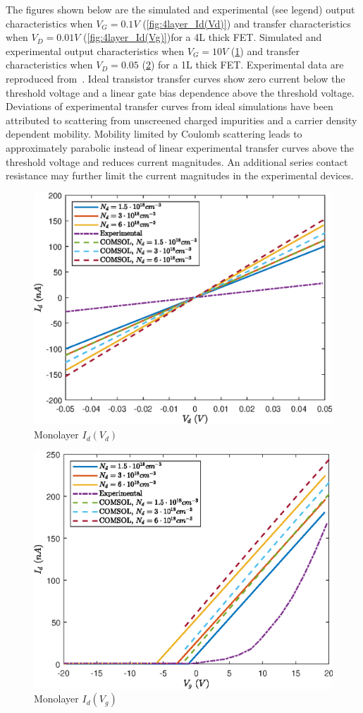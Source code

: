 \documentclass[12pt,a4paper,titlepage]{article}
\begin{document}
The figures shown below are the simulated and experimental (see legend) output characteristics when $V_G = 0.1 V$ (\ref{fig:4layer_Id(Vd)}) and transfer characteristics when $V_D = 0.01 V$ (\ref{fig:4layer_Id(Vg)})for a 4L thick FET. Simulated and experimental output characteristics when $V_G = 10 V$ (\ref{fig:monolayer_Id(Vd)}) and transfer characteristics when $V_D = 0.05$ (\ref{fig:monolayer_Id(Vg)}) for a 1L thick FET. Experimental data are reproduced from~\cite{Wu:Ultrathin_MoS2}. Ideal transistor transfer curves show zero current below the threshold voltage and a linear gate bias dependence above the threshold voltage. Deviations of experimental transfer curves from ideal simulations have been attributed to scattering from unscreened charged impurities and a carrier density dependent mobility. Mobility limited by Coulomb scattering leads to approximately parabolic instead of linear experimental transfer curves above the threshold voltage and reduces current magnitudes. An additional series contact resistance may further limit the current magnitudes in the experimental devices.

\begin{figure}[H]
	\centering
	\includegraphics[width=.8\textwidth]{Grafici/monolayer_Id(Vd).eps} 
	\caption{Monolayer $I_d(V_d)$}
	\label{fig:monolayer_Id(Vd)}
\end{figure}

\begin{figure}[H]
	\centering
	\includegraphics[width=.8\textwidth]{Grafici/monolayer_Id(Vg).eps} 
	\caption{Monolayer $I_d(V_g)$}
	\label{fig:monolayer_Id(Vg)}
\end{figure}
\end{document}
